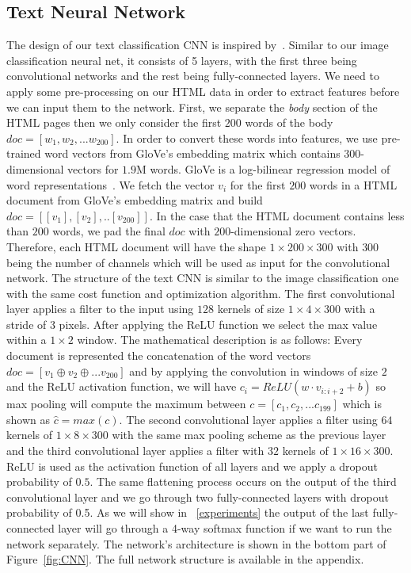 \documentclass{article} %
\begin{document}
\subsection{Text Neural Network}
The design of our text classification CNN is inspired by~\cite{convtext}. Similar to our image classification neural net, it consists of 5 layers, with the first three being convolutional networks and the rest being fully-connected layers. We need to apply some pre-processing on our HTML data in order to extract features before we can input them to the network. First, we separate the \textit{body} section of the HTML pages then we only consider the first $200$ words of the body $doc=[w_1,w_2,...w_{200}]$. In order to convert these words into features, we use pre-trained word vectors from GloVe's embedding matrix which contains 300-dimensional vectors for $1.9$M words. GloVe is a log-bilinear regression model of word representations~\cite{glove}. We fetch the vector $v_i$ for the first $200$ words in a HTML document from GloVe's embedding matrix and build $doc = [[v_1],[v_2],..[v_{200}]]$. In the case that the HTML document contains less than $200$ words, we pad the final $doc$ with $200$-dimensional zero vectors. Therefore, each HTML document will have the shape $1\times200\times300$ with $300$ being the number of channels which will be used as input for the convolutional network. The structure of the text CNN is similar to the image classification one with the same cost function and optimization algorithm. The first convolutional layer applies a filter to the input using $128$ kernels of size $1\times4\times300$ with a stride of $3$ pixels. After applying the ReLU function we select the max value within a $1\times2$ window. The mathematical description is as follows:
Every document is represented the concatenation of the word vectors $doc = [v_1 \oplus v_2 \oplus ... v_{200}]$ and by applying the convolution in windows of size $2$ and the ReLU activation function, we will have $c_i = ReLU(w\cdot v_{i:i+2} +b)$ so max pooling will compute the maximum between $c = [c_1, c_2, ... c_{199}]$ which is shown as $\hat{c} = max(c)$.
The second convolutional layer applies a filter using $64$ kernels of $1\times8\times300$ with the same max pooling scheme as the previous layer and the third convolutional layer applies a filter with $32$ kernels of $1\times16\times300$. ReLU is used as the activation function of all layers and we apply a dropout probability of $0.5$. The same flattening process occurs on the output of the third convolutional layer and we go through two fully-connected layers with dropout probability of 0.5. As we will show in ~\ref{experiments} the output of the last fully-connected layer will go through a 4-way softmax function if we want to run the network separately. The network's architecture is shown in the bottom part of Figure~\ref{fig:CNN}. The full network structure is available in the appendix.
\end{document}
